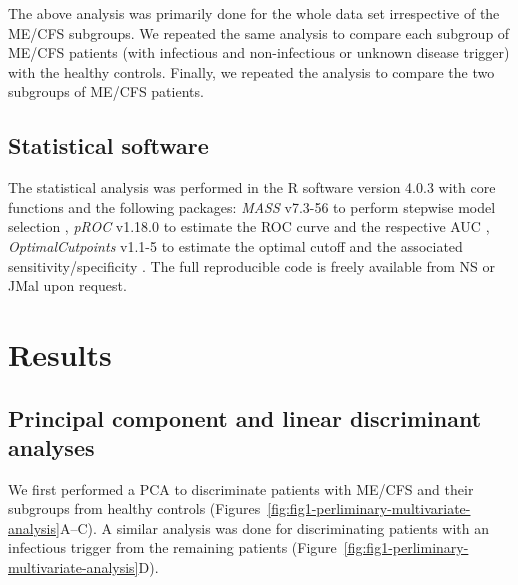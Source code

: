 The above analysis was primarily done for the whole data set irrespective of the ME/CFS subgroups. We repeated the same analysis to compare each subgroup of ME/CFS patients (with infectious and non-infectious or unknown disease trigger) with the healthy controls. Finally, we repeated the analysis to compare the two subgroups of ME/CFS patients.

\subsection{Statistical software}

The statistical analysis was performed in the R software version 4.0.3 with core functions and the following packages: \textit{MASS} v7.3-56 to perform stepwise model selection \citep{venables2002ModernApplied}, \textit{pROC} v1.18.0 to estimate the ROC curve and the respective AUC \citep{pRoccite}, \textit{OptimalCutpoints} v1.1-5 to estimate the optimal cutoff and the associated sensitivity/specificity \citep{OptimalCutpointscite}. The full reproducible code is freely available from NS or JMal upon request.

\section{Results}

\subsection{Principal component and linear discriminant analyses}

We first performed a PCA to discriminate patients with ME/CFS and their subgroups from healthy controls (Figures~\ref{fig:fig1-perliminary-multivariate-analysis}A--C). A similar analysis was done for discriminating patients with an infectious trigger from the remaining patients (Figure~\ref{fig:fig1-perliminary-multivariate-analysis}D).

